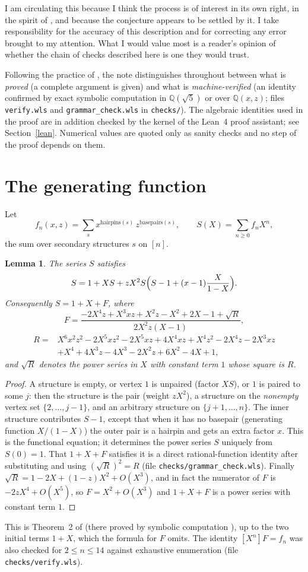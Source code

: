 \documentclass[11pt]{amsart}
\newtheorem{lemma}[theorem]{Lemma}
\theoremstyle{remark}
\begin{document}
I am circulating this because I think the process is of interest in its own right, in the spirit of \cite{P}, and
because the conjecture appears to be settled by it. I take responsibility for the accuracy of this description and
for correcting any error brought to my attention. What I would value most is a reader's opinion of whether the
chain of checks described here is one they would trust.

Following the practice of \cite{P}, the note distinguishes throughout between what is \emph{proved} (a complete
argument is given) and what is \emph{machine-verified} (an identity confirmed by exact symbolic computation in
$\mathbb Q(\sqrt5)$ or over $\mathbb Q(x,z)$; files \texttt{verify.wls} and \texttt{grammar\_check.wls} in
\texttt{checks/}).
The algebraic identities used in the proof are in addition checked by the kernel of the Lean~4 proof assistant; see
Section~\ref{lean}. Numerical values are quoted only as sanity checks and no step of the proof depends on them.

\section{The generating function}
Let
\[
f_n(x,z)=\sum_{s} x^{\mathrm{hairpins}(s)}\,z^{\mathrm{basepairs}(s)},\qquad S(X)=\sum_{n\ge0}f_n X^n,
\]
the sum over secondary structures $s$ on $[n]$.

\begin{lemma}\label{gf}
The series $S$ satisfies
\[
S=1+XS+zX^2S\Bigl(S-1+(x-1)\frac{X}{1-X}\Bigr).
\]
Consequently $S=1+X+F$, where
\[
F=\frac{-2X^4z+X^3xz+X^2z-X^2+2X-1+\sqrt R}{2X^2z(X-1)},
\]
\[
\begin{aligned}
R={}&X^6x^2z^2-2X^5xz^2-2X^5xz+4X^4xz+X^4z^2-2X^4z-2X^3xz\\&+X^4+4X^3z-4X^3-2X^2z+6X^2-4X+1,
\end{aligned}
\]
and $\sqrt R$ denotes the power series in $X$ with constant term $1$ whose square is $R$.
\end{lemma}
\begin{proof}
A structure is empty, or vertex $1$ is unpaired (factor $XS$), or $1$ is paired to some $j$: then the
structure is the pair (weight $zX^2$), a structure on the \emph{nonempty} vertex set $\{2,\dots,j-1\}$, and an arbitrary
structure on $\{j+1,\dots,n\}$. The inner structure contributes $S-1$, except that when it has no basepair
(generating function $X/(1-X)$) the outer pair is a hairpin and gets an extra factor $x$. This is the functional
equation; it determines the power series $S$ uniquely from $S(0)=1$. That $1+X+F$ satisfies it is a direct
rational-function identity after substituting and using $(\sqrt R)^2=R$ (file \texttt{checks/grammar\_check.wls}). Finally
$\sqrt R=1-2X+(1-z)X^2+O(X^3)$, and in fact the numerator of $F$ is $-2zX^4+O(X^5)$, so $F=X^2+O(X^3)$ and $1+X+F$ is
a power series with constant term $1$.
\end{proof}
This is Theorem~2 of \cite{BKZ} (there proved by symbolic computation \cite{B}), up to the two initial terms
$1+X$, which the formula for $F$ omits. The identity $[X^n]F=f_n$ was also checked for $2\le n\le14$ against exhaustive
enumeration (file \texttt{checks/verify.wls}).
\end{document}
